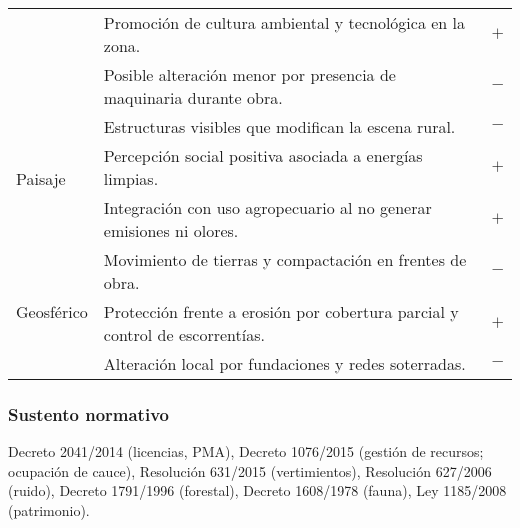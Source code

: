 \begin{table}[H]
\begin{tabular}{|l|p{11cm}|c|}
& Promoción de cultura ambiental y tecnológica en la zona. & $+$\\
& Posible alteración menor por presencia de maquinaria durante obra. & $-$\\
\hline
\multirow{3}{*}{Paisaje} 
& Estructuras visibles que modifican la escena rural. & $-$\\
& Percepción social positiva asociada a energías limpias. & $+$\\
& Integración con uso agropecuario al no generar emisiones ni olores. & $+$\\
\hline
\multirow{3}{*}{Geosférico} 
& Movimiento de tierras y compactación en frentes de obra. & $-$\\
& Protección frente a erosión por cobertura parcial y control de escorrentías. & $+$\\
& Alteración local por fundaciones y redes soterradas. & $-$\\
\hline
\end{tabular}
\end{table}

\subsubsection*{Sustento normativo}
Decreto 2041/2014 (licencias, PMA), Decreto 1076/2015 (gestión de recursos; ocupación de cauce), Resolución 631/2015 (vertimientos), Resolución 627/2006 (ruido), Decreto 1791/1996 (forestal), Decreto 1608/1978 (fauna), Ley 1185/2008 (patrimonio).
